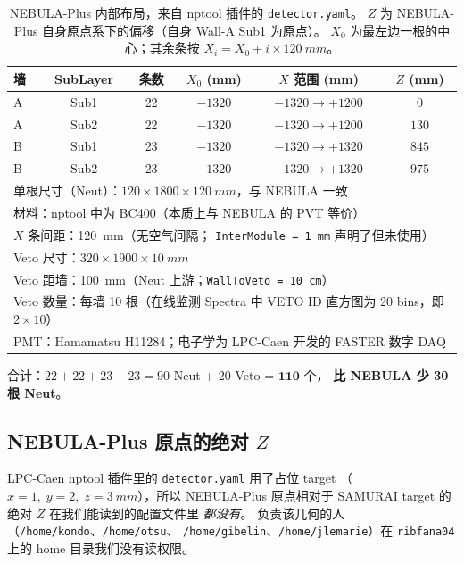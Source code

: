 \documentclass[a4paper,11pt]{ctexart}
\newcommand{\NEB}{NEBULA}
\newcommand{\NPL}{NEBULA-Plus}
\begin{document}
\begin{table}[h]
\centering
\caption{\NPL{} 内部布局，来自 nptool 插件的 \texttt{detector.yaml}。
$Z$ 为 \NPL{} 自身原点系下的偏移（自身 Wall-A Sub1 为原点）。
$X_{0}$ 为最左边一根的中心；其余条按 $X_i = X_0 + i \times \SI{120}{mm}$。}
\begin{tabular}{lccccc}
\toprule
墙 & SubLayer & 条数 & $X_0$ (mm) & $X$ 范围 (mm) & $Z$ (mm)\\
\midrule
A & Sub1 & 22 & $-1320$ & $-1320 \to +1200$ & $0$\\
A & Sub2 & 22 & $-1320$ & $-1320 \to +1200$ & $130$\\
B & Sub1 & 23 & $-1320$ & $-1320 \to +1320$ & $845$\\
B & Sub2 & 23 & $-1320$ & $-1320 \to +1320$ & $975$\\
\midrule
\multicolumn{6}{l}{单根尺寸（Neut）：$120 \times 1800 \times \SI{120}{mm}$，与 \NEB{} 一致}\\
\multicolumn{6}{l}{材料：nptool 中为 BC400（本质上与 \NEB{} 的 PVT 等价）}\\
\multicolumn{6}{l}{$X$ 条间距：\SI{120}{mm}（无空气间隔；
                  \texttt{InterModule = 1\,mm} 声明了但未使用）}\\
\multicolumn{6}{l}{Veto 尺寸：$320 \times 1900 \times \SI{10}{mm}$}\\
\multicolumn{6}{l}{Veto 距墙：\SI{100}{mm}（Neut 上游；\texttt{WallToVeto = 10\,cm}）}\\
\multicolumn{6}{l}{Veto 数量：每墙 10 根（在线监测 Spectra 中 VETO ID 直方图为 20 bins，即 $2\times10$）}\\
\multicolumn{6}{l}{PMT：Hamamatsu H11284；电子学为 LPC-Caen 开发的 FASTER 数字 DAQ}\\
\bottomrule
\end{tabular}
\end{table}

合计：$22+22+23+23 = 90$ Neut + 20 Veto = $\mathbf{110}$ 个，
\textbf{比 \NEB{} 少 30 根 Neut}。

\subsection{\NPL{} 原点的绝对 $Z$}

LPC-Caen nptool 插件里的 \texttt{detector.yaml} 用了占位 target
（$x=1,\;y=2,\;z=\SI{3}{mm}$），所以 \NPL{} 原点相对于 SAMURAI
target 的绝对 $Z$ 在我们能读到的配置文件里 \emph{都没有}。
负责该几何的人（\texttt{/home/kondo}、\texttt{/home/otsu}、
\texttt{/home/gibelin}、\texttt{/home/jlemarie}）在 \texttt{ribfana04}
上的 home 目录我们没有读权限。
\end{document}
